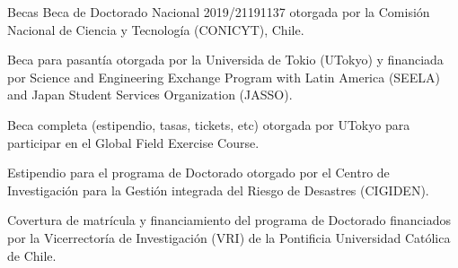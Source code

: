 \begin{rubric}{Becas}
\entry*[2019]%
	Beca de Doctorado Nacional 2019/21191137 otorgada por la Comisi\'on Nacional de Ciencia y Tecnolog\'ia (CONICYT), Chile.

\entry*[2018]%
	Beca para pasantía otorgada por la Universida de Tokio (UTokyo) y financiada por Science and Engineering Exchange Program with Latin America (SEELA) and Japan Student Services Organization (JASSO).

\entry*[2017]%
	Beca completa (estipendio, tasas, tickets, etc) otorgada por UTokyo para participar en el Global Field Exercise Course.

\entry*[2016 - 2018]%
	Estipendio para el programa de Doctorado otorgado por el Centro de Investigación para la Gestión integrada del Riesgo de Desastres (CIGIDEN).

\entry*[2015 - 2017]%
	Covertura de matrícula y financiamiento del programa de Doctorado financiados por la Vicerrectoría de Investigación (VRI) de la Pontificia Universidad Católica de Chile.
\end{rubric}
